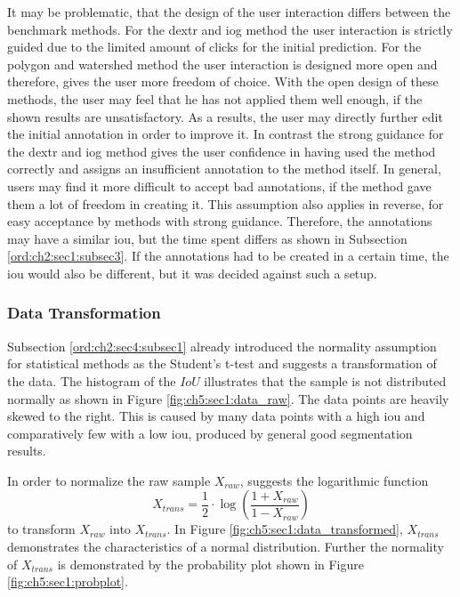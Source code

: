 It may be problematic, that the design of the user interaction differs between the benchmark methods.
For the \gls{dextr} and \gls{iog} method the user interaction is strictly guided due to the limited amount of clicks for the initial prediction.
For the polygon and watershed method the user interaction is designed more open and therefore, gives the user more freedom of choice.
With the open design of these methods, the user may feel that he has not applied them well enough, if the shown results are unsatisfactory.
As a results, the user may directly further edit the initial annotation in order to improve it.
In contrast the strong guidance for the \gls{dextr} and \gls{iog} method gives the user confidence in having used the method correctly and assigns an insufficient annotation to the method itself.
In general, users may find it more difficult to accept bad annotations, if the method gave them a lot of freedom in creating it. 
This assumption also applies in reverse, for easy acceptance by methods with strong guidance.
Therefore, the annotations may have a similar \gls{iou}, but the time spent differs as shown in Subsection \ref{ord:ch2:sec1:subsec3}.
If the annotations had to be created in a certain time, the \gls{iou} would also be different, but it was decided against such a setup.


\subsubsection{Data Transformation}
Subsection \ref{ord:ch2:sec4:subsec1} already introduced the normality assumption for statistical methods as the Student's t-test and suggests a transformation of the data.
The histogram of the $IoU$ illustrates that the sample is not distributed normally as shown in Figure \ref{fig:ch5:sec1:data_raw}.
The data points are heavily skewed to the right. 
This is caused by many data points with a high \gls{iou} and comparatively few with a low \gls{iou}, produced by general good segmentation results.

In order to normalize the raw sample $ X_{raw} $, \cite{PS16-Statistics} suggests the logarithmic function
\begin{equation} \label{equ:trans_iou}
	X_{trans} = \frac{1}{2} \cdot \log \left( \frac{1 + X_{raw}}{1 - X_{raw}}\right) 
\end{equation}
to transform $ X_{raw} $ into $ X_{trans} $.
In Figure \ref{fig:ch5:sec1:data_transformed}, $ X_{trans} $ demonstrates the characteristics of a normal distribution.
Further the normality of $ X_{trans} $ is demonstrated by the probability plot shown in Figure \ref{fig:ch5:sec1:probplot}.

